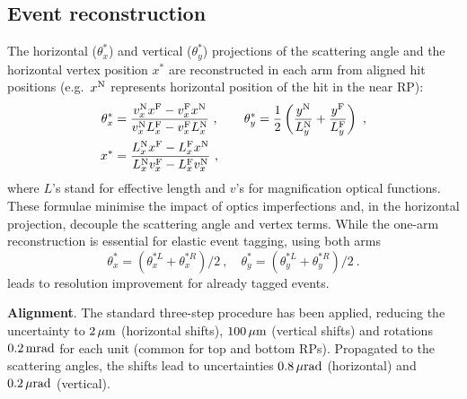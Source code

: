 \documentclass[twocolumn,a4paper,superscriptaddress,preprintnumbers,showpacs,nofootinbib]{revtex4-1}
\def\un#1{\,{\rm #1}}
\begin{document}
\subsection{Event reconstruction}

The horizontal ($\theta_x^*$) and vertical ($\theta_y^*$) projections of the scattering angle and the horizontal
vertex position $x^*$ are reconstructed in each arm from aligned hit positions (e.g.~$x^{\rm N}$ represents horizontal
position of the hit in the near RP):
\begin{equation}
\label{eq:kin 1a}
	\begin{aligned}
		\theta_x^* &= {v_x^{\rm N} x^{\rm F} - v_x^{\rm F} x^{\rm N}\over v_x^{\rm N} L_x^{\rm F} - v_x^{\rm F} L_x^{\rm N}}\ ,\qquad
		\theta_y^* = {1\over 2} \left( {y^{\rm N}\over L_y^{\rm N}} + {y^{\rm F}\over L_y^{\rm F}} \right)\ ,\\
		x^* &= {L_x^{\rm N} x^{\rm F} - L_x^{\rm F} x^{\rm N}\over L_x^{\rm N} v_x^{\rm F} - L_x^{\rm F} v_x^{\rm N}}\ , \\
	\end{aligned}
\end{equation}
where $L$'s stand for effective length and $v$'s for magnification optical functions. These formulae minimise the
impact of optics imperfections and, in the horizontal projection, decouple the scattering angle and vertex terms.
While the one-arm reconstruction is essential for elastic event tagging, using both arms
\begin{equation}
\label{eq:kin 2a}
\theta_x^* = (\theta_x^{*L} + \theta_x^{*R})/2\ ,\quad \theta_y^* = (\theta_y^{*L} + \theta_y^{*R})/2\ .
\end{equation}
leads to resolution improvement for already tagged events.

{\bf Alignment}. The standard three-step procedure \cite{totem-ijmp} has been applied, reducing the uncertainty to $2\un{\mu m}$ (horizontal shifts), $100\un{\mu m}$ (vertical shifts) and rotations $0.2\un{mrad}$ for each unit (common for top and bottom RPs). Propagated to the scattering angles, the shifts lead to uncertainties %
$0.8\un{\mu rad}$ (horizontal) and $0.2\un{\mu rad}$ (vertical).
\end{document}
